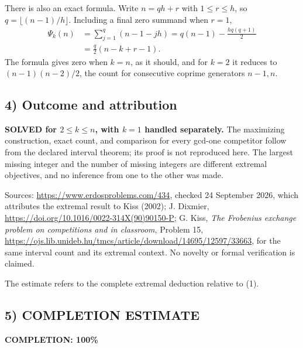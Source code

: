 There is also an exact formula. Write $n=qh+r$ with $1\le r\le h$, so $q=\lfloor(n-1)/h\rfloor$. Including a final zero summand when $r=1$,
\begin{align*}
\Psi_k(n)&=\sum_{j=1}^q(n-1-jh)
=q(n-1)-\frac{h q(q+1)}2\\
&=\frac q2(n-k+r-1).
\end{align*}
The formula gives zero when $k=n$, as it should, and for $k=2$ it reduces to $(n-1)(n-2)/2$, the count for consecutive coprime generators $n-1,n$.

\subsection*{4) Outcome and attribution}
\textbf{SOLVED for $2\le k\le n$, with $k=1$ handled separately.} The maximizing construction, exact count, and comparison for every gcd-one competitor follow from the declared interval theorem; its proof is not reproduced here. The largest missing integer and the number of missing integers are different extremal objectives, and no inference from one to the other was made.

Sources: \url{https://www.erdosproblems.com/434}, checked 24 September 2026, which attributes the extremal result to Kiss (2002); J. Dixmier, \url{https://doi.org/10.1016/0022-314X(90)90150-P}; G. Kiss, \emph{The Frobenius exchange problem on competitions and in classroom}, Problem 15, \url{https://ojs.lib.unideb.hu/tmcs/article/download/14695/12597/33663}, for the same interval count and its extremal context. No novelty or formal verification is claimed.

The estimate refers to the complete extremal deduction relative to (1).
\subsection*{5) COMPLETION ESTIMATE}
\textbf{COMPLETION: 100\%}
